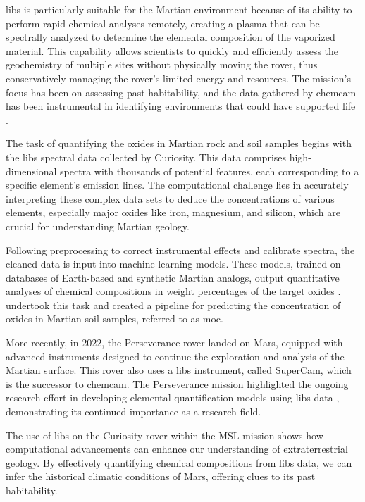 \gls{libs} is particularly suitable for the Martian environment because of its ability to perform rapid chemical analyses remotely, creating a plasma that can be spectrally analyzed to determine the elemental composition of the vaporized material.
This capability allows scientists to quickly and efficiently assess the geochemistry of multiple sites without physically moving the rover, thus conservatively managing the rover's limited energy and resources.
The mission's focus has been on assessing past habitability, and the data gathered by \gls{chemcam} has been instrumental in identifying environments that could have supported life \cite{chemcamNasaWebsite, curiosityNasaWebsite}.

The task of quantifying the oxides in Martian rock and soil samples begins with the \gls{libs} spectral data collected by Curiosity.
This data comprises high-dimensional spectra with thousands of potential features, each corresponding to a specific element's emission lines.
The computational challenge lies in accurately interpreting these complex data sets to deduce the concentrations of various elements, especially major oxides like iron, magnesium, and silicon, which are crucial for understanding Martian geology.

Following preprocessing to correct instrumental effects and calibrate spectra, the cleaned data is input into machine learning models.
These models, trained on databases of Earth-based and synthetic Martian analogs, output quantitative analyses of chemical compositions in weight percentages of the target oxides \cite{wiensPreflightCalibrationInitial2013, cleggRecalibrationMarsScience2017}.
\citet{cleggRecalibrationMarsScience2017} undertook this task and created a pipeline for predicting the concentration of oxides in Martian soil samples, referred to as \gls{moc}.

More recently, in 2022, the Perseverance rover landed on Mars, equipped with advanced instruments designed to continue the exploration and analysis of the Martian surface.
This rover also uses a \gls{libs} instrument, called SuperCam, which is the successor to \gls{chemcam}.
The Perseverance mission highlighted the ongoing research effort in developing elemental quantification models using \gls{libs} data \cite{andersonPostlandingMajorElement2022}, demonstrating its continued importance as a research field.

The use of \gls{libs} on the Curiosity rover within the MSL mission shows how computational advancements can enhance our understanding of extraterrestrial geology.
By effectively quantifying chemical compositions from \gls{libs} data, we can infer the historical climatic conditions of Mars, offering clues to its past habitability.